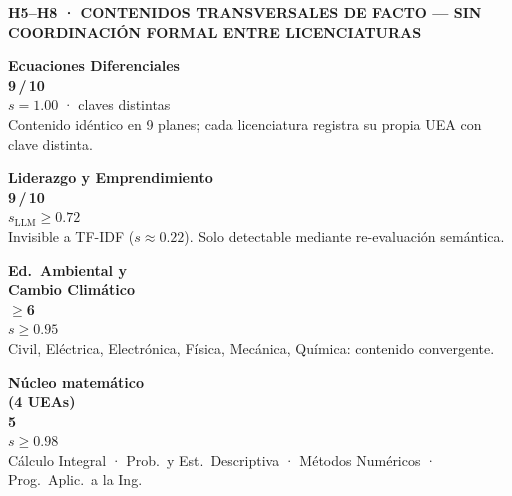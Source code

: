\documentclass[9pt,a4paper]{article}
\newcommand{\MEDNUM}[1]{{\fontsize{17}{19}\selectfont\bfseries#1}}
\newcommand{\SECTHEAD}[1]{%
  {\footnotesize\bfseries\color{uamblue}\MakeUppercase{#1}}\par\vspace{2pt}}
\begin{document}
\begin{tcolorbox}[grayband]
\SECTHEAD{h5–h8 · contenidos transversales de facto — sin coordinación formal entre licenciaturas}
\begin{minipage}[t]{0.237\linewidth}
\begin{tcolorbox}[famcard,colback=navy!10,colframe=navy]
\centering
{\footnotesize\bfseries\color{navy}Ecuaciones Diferenciales}\\[2pt]
\MEDNUM{\color{navy}9\,/\,10}\\
{\tiny $s=1.00$ · claves distintas}\\[1pt]
{\tiny\color{uamgray}Contenido idéntico en 9 planes; cada licenciatura
registra su propia UEA con clave distinta.}
\end{tcolorbox}
\end{minipage}\hfill
\begin{minipage}[t]{0.237\linewidth}
\begin{tcolorbox}[famcard,colback=amber!15,colframe=amber]
\centering
{\footnotesize\bfseries\color{amber}Liderazgo y Emprendimiento}\\[2pt]
\MEDNUM{\color{amber}9\,/\,10}\\
{\tiny $s_{\mathrm{LLM}}\geq0.72$}\\[1pt]
{\tiny\color{uamgray}Invisible a TF-IDF ($s\approx0.22$). Solo
detectable mediante re-evaluación semántica.}
\end{tcolorbox}
\end{minipage}\hfill
\begin{minipage}[t]{0.237\linewidth}
\begin{tcolorbox}[famcard,colback=cAmb!10,colframe=cAmb]
\centering
{\footnotesize\bfseries\color{cAmb}Ed.\ Ambiental y\\Cambio Climático}\\[2pt]
\MEDNUM{\color{cAmb}$\geq$6}\\
{\tiny $s\geq0.95$}\\[1pt]
{\tiny\color{uamgray}Civil, Eléctrica, Electrónica,
Física, Mecánica, Química: contenido convergente.}
\end{tcolorbox}
\end{minipage}\hfill
\begin{minipage}[t]{0.237\linewidth}
\begin{tcolorbox}[famcard,colback=teal!10,colframe=teal]
\centering
{\footnotesize\bfseries\color{teal}Núcleo matemático\\(4 UEAs)}\\[2pt]
\MEDNUM{\color{teal}5}\\
{\tiny $s\geq0.98$}\\[1pt]
{\tiny\color{uamgray}Cálculo Integral · Prob.\ y Est.\ Descriptiva ·
Métodos Numéricos · Prog.\ Aplic.\ a la Ing.}
\end{tcolorbox}
\end{minipage}
\end{tcolorbox}
\end{document}
